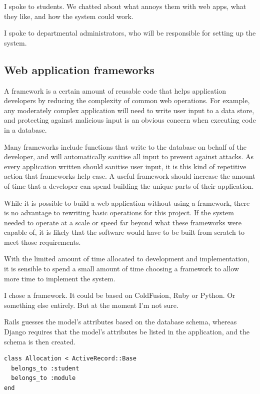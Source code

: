 \documentclass[]{scrartcl}
\begin{document}
I spoke to students. We chatted about what annoys them with web apps, what they like, and how the system could work.

I spoke to departmental administrators, who will be responsible for setting up the system.

\subsection{Web application frameworks}

A framework is a certain amount of reusable code that helps application developers by reducing the complexity of common web operations. For example, any moderately complex application will need to write user input to a data store, and protecting against malicious input is an obvious concern when executing code in a database.

Many frameworks include functions that write to the database on behalf of the developer, and will automatically sanitise all input to prevent against attacks. As every application written should sanitise user input, it is this kind of repetitive action that frameworks help ease. A useful framework should increase the amount of time that a developer can spend building the unique parts of their application.

While it is possible to build a web application without using a framework, there is no advantage to rewriting basic operations for this project. If the system needed to operate at a scale or speed far beyond what these frameworks were capable of, it is likely that the software would have to be built from scratch to meet those requirements.

With the limited amount of time allocated to development and implementation, it is sensible to spend a small amount of time choosing a framework to allow more time to implement the system.


I chose a framework. It could be based on ColdFusion, Ruby or Python. Or something else entirely. But at the moment I'm not sure.

Rails guesses the model's attributes based on the database schema, whereas Django requires that the model's attributes be listed in the application, and the schema is then created.

\begin{lstlisting}
class Allocation < ActiveRecord::Base
  belongs_to :student
  belongs_to :module
end
\end{lstlisting}
\end{document}

